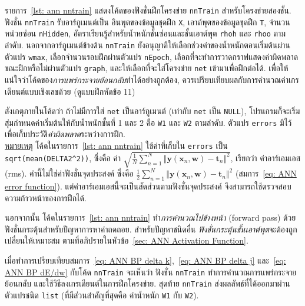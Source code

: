 รายการ~\ref{lst: ann nntrain} แสดงโค้ดของฟังชั่นฝึกโครงข่าย \texttt{nnTrain} สำหรับโครงข่ายสองชั้น.
ฟังชั่น \texttt{nnTrain} รับอาร์กูเมนต์เป็น อินพุตของข้อมูลชุดฝึก \texttt{X}, เอาต์พุตของข้อมูลชุดฝึก \texttt{T}, จำนวนหน่วยซ่อน \texttt{nHidden}, อัตราเรียนรู้สำหรับน้ำหนักชั้นซ่อนและชั้นเอาต์พุต \texttt{rhoh} และ \texttt{rhoo} ตามลำดับ.
นอกจากอาร์กูเมนต์ข้างต้น \texttt{nnTrain} ยังอนุญาติให้เลือกช่วงค่าของน้ำหนักตอนเริ่มต้นผ่านตัวแปร \texttt{wmax}, เลือกจำนวนรอบฝึกผ่านตัวแปร \texttt{nEpoch}, เลือกที่จะทำการวาดกราฟแสดงค่าผิดพลาดขณะฝึกหรือไม่ผ่านตัวแปร \texttt{graph}, และให้เลือกที่จะใส่โครงข่าย \texttt{net} เข้ามาเพื่อฝึกต่อได้.
เพื่อให้แน่ใจว่าโค้ดของ\textit{การแพร่กระจายย้อนกลับ}ทำได้อย่างถูกต้อง, 
ควรเปรียบเทียบผลกับการคำนวณค่าเกรเดียนต์แบบเชิงเลขด้วย (ดูแบบฝึกหัดข้อ 11)



สังเกตุภายในโค้ดว่า ถ้าไม่มีการใส่ \texttt{net} เป็นอาร์กูเมนต์ (เท่ากับ \texttt{net} เป็น \texttt{NULL}),
โปรแกรมก็จะเริ่มสุ่มกำหนดค่าเริ่มต้นให้กับน้ำหนักชั้นที่ 1 และ 2 คือ \texttt{W1} และ \texttt{W2} ตามลำดับ.
ตัวแปร \texttt{errors} มีไว้เพื่อเก็บประวัติ\textit{ค่าผิดพลาด}ระหว่างการฝึก.
\\
\underline{หมายเหตุ} 
โค้ดในรายการ~\ref{lst: ann nntrain} ใช้ค่าที่เก็บใน \texttt{errors} 
เป็น \verb|sqrt(mean(DELTA2^2))|, 
ซึ่งคือ ค่า $\sqrt{\frac{1}{N} \sum_{n=1}^N \Vert \mathbf{y}(\mathbf{x}_n, \mathbf{w}) - \mathbf{t}_n \Vert^2}$, เรียกว่า ค่าอาร์เอมเอส (rms).
ค่านี้ไม่ใช่ค่าฟังชั่นจุดประสงค์ ซึ่งคือ $\frac{1}{2} \sum_{n=1}^N \Vert \mathbf{y}(\mathbf{x}_n, \mathbf{w}) - \mathbf{t}_n \Vert^2$ (สมการ~\ref{eq: ANN error function}).
แต่ค่าอาร์เอมเอสนี้จะเป็นสัดส่วนตามฟังชั่นจุดประสงค์ จึงสามารถใช้ตรวจสอบความก้าวหน้าของการฝึกได้.

นอกจากนั้น โค้ดในรายการ~\ref{lst: ann nntrain} ทำ\textit{การคำนวณไปข้างหน้า} (forward pass) ด้วยฟังชั่นกระตุ้นสำหรับปัญหาการหาค่าถดถอย.
สำหรับปัญหาชนิดอื่น \textit{ฟังชั่นกระตุ้นชั้นเอาต์พุต}จะต้องถูกเปลี่ยนให้เหมาะสม ตามที่อภิปรายในหัวข้อ~\ref{sec: ANN Activation Function}.

เมื่อทำการเปรียบเทียบสมการ~\ref{eq: ANN BP delta k},~\ref{eq: ANN BP delta j} และ~\ref{eq: ANN BP dE/dw} กับโค้ด \texttt{nnTrain} จะเห็นว่า ฟังชั่น \texttt{nnTrain} ทำการคำนวณการแพร่กระจายย้อนกลับ และใช้วิธีลงเกรเดียนต์ในการฝึกโครงข่าย.
สุดท้าย \texttt{nnTrain} ส่งผลลัพธ์ที่ได้ออกมาผ่านตัวแปรชนิด \texttt{list} (ที่มีส่วนสำคัญที่สุดคือ ค่าน้ำหนัก \texttt{W1} กับ \texttt{W2}).

